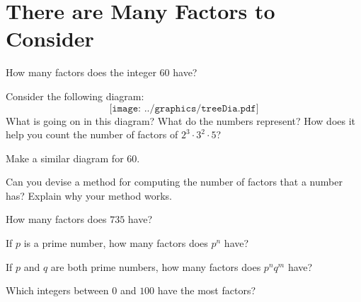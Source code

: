 \newpage
\section{There are Many Factors to Consider}\label{A:CF}

\begin{prob} How many factors does the integer $60$ have?
\end{prob}

\begin{prob}
Consider the following diagram:
\[
\texttt{[image: ../graphics/treeDia.pdf]}
\]
What is going on in this diagram? What do the numbers represent? How
does it help you count the number of factors of $2^3\cdot 3^2 \cdot
5$?
\end{prob}

\begin{prob}
Make a similar diagram for $60$.
\end{prob}

\begin{prob} 
Can you devise a method for computing the number of factors that a
number has? Explain why your method works.
\end{prob}

\begin{prob} How many factors does $735$ have?
\end{prob}

\begin{prob} 
If $p$ is a prime number, how many factors does $p^n$ have?
\end{prob}

\begin{prob} 
If $p$ and $q$ are both prime numbers, how many factors does $p^nq^m$
have?
\end{prob}

\begin{prob} Which integers between $0$ and $100$ have the most factors?         
\end{prob}
